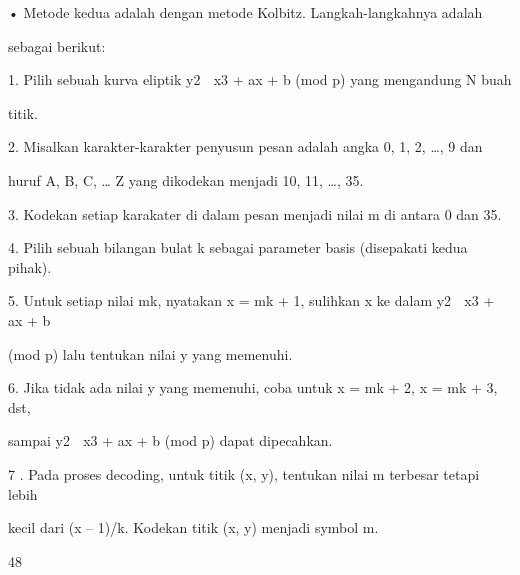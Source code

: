 \documentclass{article}
\begin{document}

• Metode kedua adalah dengan metode Kolbitz. Langkah-langkahnya adalah 

sebagai berikut:

   1.  Pilih sebuah kurva eliptik y2  x3 + ax + b  (mod p) yang mengandung N buah 

titik.

   2.  Misalkan karakter-karakter penyusun pesan adalah angka 0, 1, 2, …, 9 dan 

huruf A, B, C, … Z yang dikodekan menjadi 10, 11, …, 35.

   3.  Kodekan setiap karakater di dalam pesan menjadi nilai m di antara 0 dan 35.

   4.  Pilih sebuah bilangan bulat k sebagai parameter basis (disepakati kedua pihak). 

   5.  Untuk setiap nilai mk, nyatakan x = mk + 1, sulihkan x ke dalam y2  x3 + ax + b  

(mod p) lalu tentukan nilai y yang memenuhi.

   6.  Jika tidak ada nilai y yang memenuhi, coba untuk x = mk + 2, x = mk + 3, dst, 

sampai y2  x3 + ax + b  (mod p) dapat dipecahkan.

   7 . Pada proses decoding, untuk titik (x, y), tentukan nilai m terbesar tetapi lebih 

kecil dari (x – 1)/k. Kodekan titik (x, y) menjadi symbol m.  

48
\end{document}
